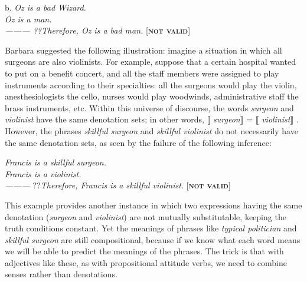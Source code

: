 \ea
  b.  \textit{Oz is a bad Wizard.}\\
\textit{Oz is a man.\\
———\FelixHRule
??Therefore, Oz is a bad man.}   [\textbf{\textsc{not valid}}]
\z


Barbara \citet{Partee1995} suggested the following illustration: imagine a situation in which all surgeons are also violinists. For example, suppose that a certain hospital wanted to put on a benefit concert, and all the staff members were assigned to play instruments according to their specialties: all the surgeons would play the violin, anesthesiologists the cello, nurses would play woodwinds, administrative staff the brass instruments, etc. Within this universe of discourse, the words \textit{surgeon} and \textit{violinist} have the same denotation sets; in other words, $\llbracket$ \textit{surgeon}$\rrbracket$  = $\llbracket$ \textit{violinist}$\rrbracket$ . However, the phrases \textit{skillful surgeon} and \textit{skillful violinist} do not necessarily have the same denotation sets, as seen by the failure of the following inference:


\ea






  \textit{Francis is a skillful surgeon.}\\
\textit{Francis is a violinist.\\
———\FelixHRule
}??\textit{Therefore, Francis is a skillful violinist.}   [\textbf{\textsc{not valid}}]
\z


This example provides another instance in which two expressions having the same denotation (\textit{surgeon} and \textit{violinist}) are not mutually substitutable, keeping the truth conditions constant. Yet the meanings of phrases like \textit{typical politician} and \textit{skillful surgeon} are still compositional, because if we know what each word means we will be able to predict the meanings of the phrases. The trick is that with adjectives like these, as with propositional attitude verbs, we need to combine senses rather than denotations.



